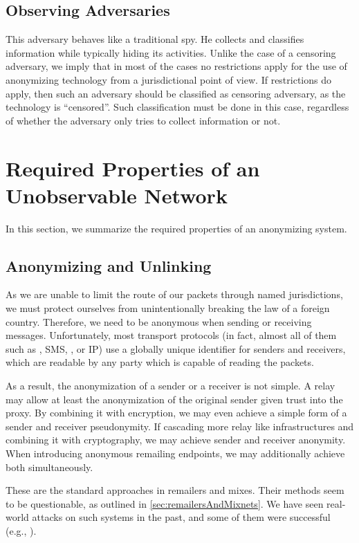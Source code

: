 \subsection{Observing Adversaries}
This adversary behaves like a traditional spy. He collects and classifies information while typically hiding its activities. Unlike the case of a censoring adversary, we imply that in most of the cases no restrictions apply for the use of anonymizing technology from a jurisdictional point of view. If restrictions do apply, then such an adversary should be classified as censoring adversary, as the technology is ``censored''. Such classification must be done in this case, regardless of whether the adversary only tries to collect information or not.

\section{Required Properties of an Unobservable Network}
In this section, we summarize the required properties of an anonymizing system.

\subsection{Anonymizing and Unlinking}
As we are unable to limit the route of our packets through named jurisdictions, we must protect ourselves from unintentionally breaking the law of a foreign country. Therefore, we need to be anonymous when sending or receiving messages. Unfortunately, most transport protocols (in fact, almost all of them such as , SMS, , or IP) use a globally unique identifier for senders and receivers, which are readable by any party which is capable of reading the packets. 

As a result, the anonymization of a sender or a receiver is not simple. A relay may allow at least the anonymization of the original sender given trust into the proxy. By combining it with encryption, we may even achieve a simple form of a sender and receiver pseudonymity. If cascading more relay like infrastructures and combining it with cryptography, we may achieve sender and receiver anonymity. When introducing anonymous remailing endpoints, we may additionally achieve both simultaneously.

These are the standard approaches in remailers and mixes. Their methods seem to be questionable, as outlined in \ref{sec:remailersAndMixnets}. We have seen real-world attacks on such systems in the past, and some of them were successful (e.g., \cite{penetClosure}).

